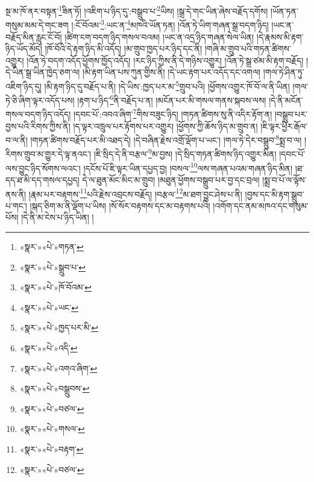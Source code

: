 སྔ་མ་ཁོ་ནར་བསྟན་\footnote{«སྣར་»«པེ་»གཏན་}ཟིན་ཏོ། །འཇིག་པ་ཉིད་དུ་:བསྒྲུབ་པ་\footnote{«སྣར་»«པེ་»སྒྲུབ་པ་}ཡིས། །སྒྲ་དེ་གང་ཡིན་ཞེས་བརྗོད་དགོས། །ཡོན་ཏན་གསུམ་མམ་དེ་གང་ཟག །:ངོ་བོའམ་\footnote{«སྣར་»«པེ་»ཁོ་བོའམ་}:ཡང་ན་\footnote{«སྣར་»«པེ་»ཡང་}མཁའི་ཡོན་ཏན། །འོན་ཏེ་ཡིག་གཞན་སྒྲ་བདག་ཉིད། །ཡང་ན་བརྗོད་མིན་རླུང་ངོ་བོ། །ཚིག་ངག་བདག་ཉིད་གསལ་བའམ། །ཡང་ན་འདྲ་ཉིད་གཞན་སེལ་ཡིན། །དེ་རྣམས་མི་རྟག་ཉིད་ཡོད་མོད། །ཁོ་བོའི་དེ་རྟག་ཉིད་མི་འདོད། །མ་གྲུབ་ཁྱད་པར་ཉིད་དང་ནི། །གཞི་མ་གྲུབ་པའི་གཏན་ཚིགས་འགྱུར། །འོན་ཏེ་བདག་འདོད་ཕྱོགས་ཁྱོད་འདོད། །རང་ཉིད་ཀྱིས་ནི་དེ་གཉིས་འགྱུར། །འོན་ཏེ་སྒྲ་ཙམ་མི་རྟག་བརྗོད། །དེ་ཡིན་སྒྲ་ཡིན་ཁྱེད་ཅག་ལ། །མི་རྟག་ཡིན་པས་ཀུན་གྱིས་ནི། །དེ་ཡང་རྟག་པར་འདོད་དང་འགལ། །གལ་ཏེ་ཤིན་ཏུ་འཇིག་ཉིད་དུ། །མི་རྟག་ཉིད་དུ་བརྗོད་པ་ནི། །དེ་ཡིས་:ཁྱད་པར་མ་\footnote{«སྣར་»«པེ་»ཁྱད་པར་མི་}གྲུབ་པའི། །ཕྱོགས་འགྱུར་ཁོ་བོ་ལ་ནི་ཡིན། །གལ་ཏེ་ཅི་ཞིག་ལྟར་འདོད་པས། །རྟག་པ་ཉིད་\footnote{«སྣར་»«པེ་»འདི་}ནི་བརྗོད་པ་ན། །མངོན་པར་མི་གསལ་གནས་སྐབས་ལས། །དེ་ནི་མངོན་གསལ་བདག་ཉིད་འདོད། །དབང་པོ་:འབའ་ཞིག་\footnote{«སྣར་»«པེ་»འགའ་ཞིག་}གིས་བཟུང་ཉིད། །གཏན་ཚིགས་སུ་ནི་འདིར་རྟོག་ན། །བསྒྲུབ་པར་བྱས་པའི་རིགས་ཀྱིས་ནི། །ད་ལྟར་འཁྲུལ་པར་རྟོགས་པར་འགྱུར། །ཕྱོགས་ཀྱི་ཆོས་ཉིད་མ་གྲུབ་ན། །ཇི་ལྟར་ཕྱིར་རྒོལ་བ་ལ་ནི། །གཏན་ཚིགས་བརྗོད་པར་མི་འཐད་དེ། །དེ་བཞིན་རྗེས་འགྲོ་ལྡོག་པ་ཡང་། །གལ་ཏེ་དེར་བསྒྲུབ་\footnote{«སྣར་»«པེ་»བསྒྲུབས་}སྨྲ་བ་ལ། །རིགས་གྲུབ་མ་གྱུར་དེ་ལྟ་ནའང་། །ཇི་སྲིད་དེ་ནི་བརྩལ་\footnote{«སྣར་»«པེ་»བཙལ་}མ་བྱས། །དེ་སྲིད་གཏན་ཚིགས་ཉིད་འགྱུར་མིན། །དབང་པོ་ལས་བྱུང་ཉིད་སོགས་ལའང་། །དངོས་པོ་ཇི་ལྟར་ཡིན་དཔྱད་བྱ། །བསལ་\footnote{«སྣར་»«པེ་»གསལ་}ལས་གཞན་པའམ་གཞན་ཉིད་མིན། །ཐ་དད་ཐ་མི་དད་གསལ་དཔྱད། དེ་ལ་ཐུན་མོང་མིང་མ་གྲུབ། །མཐུན་ཕྱོགས་བསྒྲུབ་པར་བྱ་དང་བྲལ། །སྨྲ་བ་པོ་ལ་ལྟོས་ནས་ནི། །རྣམ་པར་བརྟགས་\footnote{«སྣར་»«པེ་»བརྟག་}པའི་རྗེས་འབྲངས་བརྗོད། །བརྩལ་\footnote{«སྣར་»«པེ་»བཙལ་}མ་ཐག་བྱུང་ཤེས་པ་ནི། །བྱས་དང་མི་རྟག་སྒྲུབ་པ་གང་། །སྐད་ཅིག་མ་ནི་ལྡོག་པ་ཡིས། །སོ་སོར་བརྟགས་དང་མ་བརྟགས་པའི། །འགོག་དང་ནམ་མཁའ་དང་གསུམ་པོས། །དེ་ནི་མ་ངེས་པ་ཉིད་ཡིན། །
